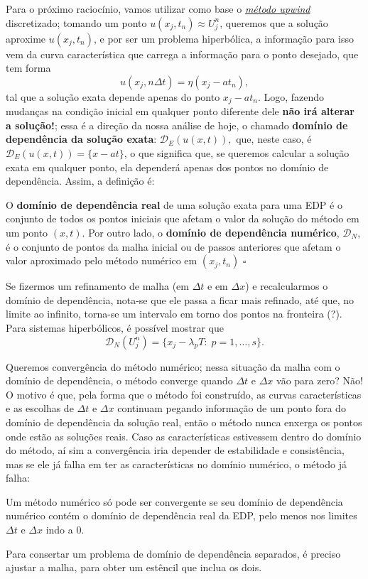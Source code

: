 \documentclass[../differential_methods.tex]{subfiles}
\begin{document}
Para o próximo raciocínio, vamos utilizar como base o \hyperlink{up_wind}{\textit{método upwind}} discretizado; tomando um ponto \(u(x_{j}, t_{n})\approx U_{j}^{n}\), queremos que a solução aproxime \(u(x_{j}, t_{n})\), e por ser um problema hiperbólica, a informação para isso vem da curva característica que carrega a informação para o ponto desejado, que tem forma
\[
	u(x_{j}, n\Delta t) = \eta (x_{j}-a t_{n}),
\]
tal que a solução exata depende apenas do ponto \(x_{j}-at_{n}\). Logo, fazendo mudanças na condição inicial em qualquer ponto diferente dele \textbf{não irá alterar a solução!}; essa é a direção da nossa análise de hoje, o chamado \textbf{domínio de dependência da solução exata}: \(\mathcal{D}_{E}(u(x, t)),\)
que, neste caso, é \(\mathcal{D}_{E}(u(x, t)) = \{x-at\}\), o que significa que, se queremos calcular a solução exata em qualquer ponto, ela dependerá apenas dos pontos no domínio de dependência. Assim, a definição é:
\begin{def*}
	O \textbf{domínio de dependência real} de uma solução exata para uma EDP é o conjunto de todos os pontos iniciais que afetam o valor da solução do método em um ponto \((x, t)\). Por outro lado, o \textbf{domínio de dependência numérico}, \(\mathcal{D}_{N}\), é o conjunto de pontos da malha inicial ou de passos anteriores que afetam o valor aproximado pelo método numérico em \((x_{j}, t_{n})\) \(\square\)
\end{def*}
Se fizermos um refinamento de malha (em \(\Delta t\) e em \(\Delta x\)) e recalcularmos o domínio de dependência, nota-se que ele passa a ficar mais refinado, até que, no limite ao infinito, torna-se um intervalo em torno dos pontos na fronteira (?).
Para sistemas hiperbólicos, é possível mostrar que
\[
	\mathcal{D}_{N}(U_{j}^{n}) = \{x_{j}-\lambda_p T:\; p = 1, \dotsc , s\}.
\]

Queremos convergência do método numérico; nessa situação da malha com o domínio de dependência, o método converge quando \(\Delta t\) e \(\Delta x\) vão para zero? Não! O motivo é que, pela forma que o método foi construído, as curvas características e as escolhas de \(\Delta t\) e \(\Delta x\) continuam pegando informação de um ponto fora do domínio de dependência da solução real, então o método nunca enxerga os pontos onde estão as soluções reais.
Caso as características estivessem dentro do domínio do método, aí sim a convergência iria depender de estabilidade e consistência, mas se ele já falha em ter as características no domínio numérico, o método já falha:
\hypertarget{cfl_condition}{\begin{theorem*}
		Um método numérico só pode ser convergente se seu domínio de dependência numérico contém o domínio de dependência real da EDP, pelo menos nos limites \(\Delta t\) e \(\Delta x\) indo a 0.
	\end{theorem*}}
Para consertar um problema de domínio de dependência separados, é preciso ajustar a malha, para obter um estêncil que inclua os dois.
\end{document}
